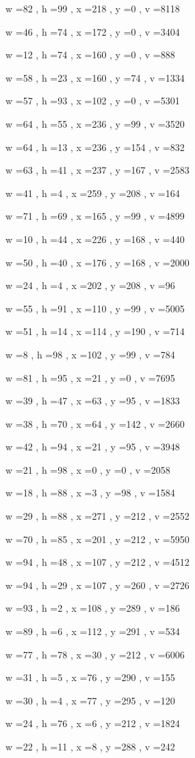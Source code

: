 \documentclass[11pt]{article}
\begin{document}
w =82 , h =99 , x =218 , y =0 , v =8118
\par
w =46 , h =74 , x =172 , y =0 , v =3404
\par
w =12 , h =74 , x =160 , y =0 , v =888
\par
w =58 , h =23 , x =160 , y =74 , v =1334
\par
w =57 , h =93 , x =102 , y =0 , v =5301
\par
w =64 , h =55 , x =236 , y =99 , v =3520
\par
w =64 , h =13 , x =236 , y =154 , v =832
\par
w =63 , h =41 , x =237 , y =167 , v =2583
\par
w =41 , h =4 , x =259 , y =208 , v =164
\par
w =71 , h =69 , x =165 , y =99 , v =4899
\par
w =10 , h =44 , x =226 , y =168 , v =440
\par
w =50 , h =40 , x =176 , y =168 , v =2000
\par
w =24 , h =4 , x =202 , y =208 , v =96
\par
w =55 , h =91 , x =110 , y =99 , v =5005
\par
w =51 , h =14 , x =114 , y =190 , v =714
\par
w =8 , h =98 , x =102 , y =99 , v =784
\par
w =81 , h =95 , x =21 , y =0 , v =7695
\par
w =39 , h =47 , x =63 , y =95 , v =1833
\par
w =38 , h =70 , x =64 , y =142 , v =2660
\par
w =42 , h =94 , x =21 , y =95 , v =3948
\par
w =21 , h =98 , x =0 , y =0 , v =2058
\par
w =18 , h =88 , x =3 , y =98 , v =1584
\par
w =29 , h =88 , x =271 , y =212 , v =2552
\par
w =70 , h =85 , x =201 , y =212 , v =5950
\par
w =94 , h =48 , x =107 , y =212 , v =4512
\par
w =94 , h =29 , x =107 , y =260 , v =2726
\par
w =93 , h =2 , x =108 , y =289 , v =186
\par
w =89 , h =6 , x =112 , y =291 , v =534
\par
w =77 , h =78 , x =30 , y =212 , v =6006
\par
w =31 , h =5 , x =76 , y =290 , v =155
\par
w =30 , h =4 , x =77 , y =295 , v =120
\par
w =24 , h =76 , x =6 , y =212 , v =1824
\par
w =22 , h =11 , x =8 , y =288 , v =242
\par
\newpage
\end{document}
